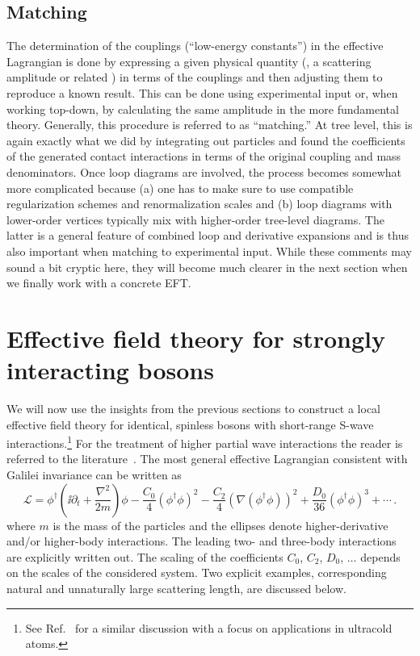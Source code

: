 \subsection{Matching}

The determination of the couplings (``low-energy constants'') in the effective 
Lagrangian is done by expressing a given physical quantity (\eg, a scattering 
amplitude or related ) in terms of the couplings and then adjusting them to 
reproduce a known result.  This can be done using experimental input or, when 
working top-down, by calculating the same amplitude in the more fundamental 
theory.  Generally, this procedure is referred to as ``matching.''  At tree 
level, this is again exactly what we did by integrating out particles and found 
the coefficients of the generated contact interactions in terms of the original 
coupling and mass denominators.  Once loop diagrams are involved, the process 
becomes somewhat more complicated because (a) one has to make sure to use 
compatible regularization schemes and renormalization scales and (b) loop 
diagrams with lower-order vertices typically mix with higher-order tree-level 
diagrams.  The latter is a general feature of combined loop and derivative 
expansions and is thus also important when matching to experimental input.  
While these comments may sound a bit cryptic here, they will become much clearer 
in the next section when we finally work with a concrete EFT.

%
\section{Effective field theory for strongly interacting bosons}
\label{sec:EFT-Bosons}

We will now use the insights from the previous sections to
construct a local effective field theory for 
identical, spinless bosons with short-range S-wave 
interactions.\footnote{See Ref.~\cite{Braaten:2004rn} for a similar 
discussion with a focus on applications in ultracold atoms.}
For the treatment of higher partial wave interactions the 
reader is referred to the 
literature~\cite{Beane:2000fx,Bertulani:2002sz,Bedaque:2003wa}. 
The most general effective Lagrangian consistent with 
Galilei invariance can be written as
\begin{equation}
 {\mathcal L} = \phi^\dagger \left(\ii\partial_t + \frac{\nabla^2}{2m} 
 \right)\phi - \frac{C_0}{4} \left(\phi^\dagger \phi
 \right)^2 - \frac{C_2}{4} \left(\nabla (\phi^\dagger \phi)\right)^2
 + \frac{D_0}{36}  \left(\phi^\dagger \phi \right)^3+\cdots \,.
\label{L-2body}
\end{equation}
where $m$ is the mass of the particles and
the ellipses denote higher-derivative and/or higher-body
interactions. The leading two- and three-body interactions are 
explicitly written out. The scaling of the coefficients $C_0$, $C_2$,
$D_0$, $\ldots$ depends on the scales of the considered
system. Two explicit examples, corresponding natural and unnaturally
large scattering length, are discussed below.

